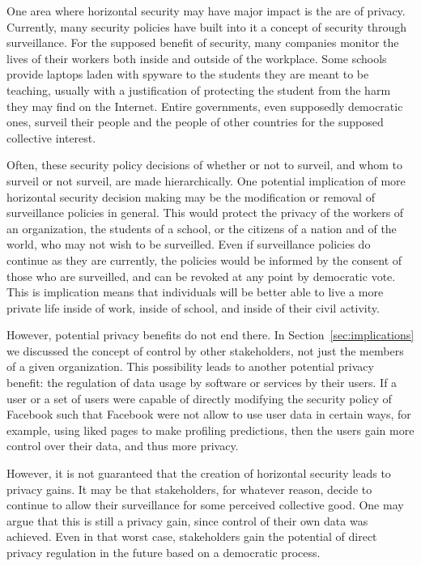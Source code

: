 One area where horizontal security may have major impact is the are of privacy.
Currently, many security policies have built into it a concept of security
through surveillance. For the supposed benefit of security, many companies
monitor the lives of their workers both inside and outside of the workplace.
Some schools provide laptops laden with spyware to the students they are meant
to be teaching, usually with a justification of protecting the student from the
harm they may find on the Internet. Entire governments, even supposedly
democratic ones, surveil their people and the people of other countries for the
supposed collective interest.

Often, these security policy decisions of whether or not to surveil, and whom
to surveil or not surveil, are made hierarchically. One potential implication
of more horizontal security decision making may be the modification or removal
of surveillance policies in general. This would protect the privacy of the
workers of an organization, the students of a school, or the citizens of a
nation and of the world, who may not wish to be surveilled. Even if surveillance
policies do continue as they are currently, the policies would be informed by
the consent of those who are surveilled, and can be revoked at any point by
democratic vote. This is implication means that individuals will be better able
to live a more private life inside of work, inside of school, and inside of
their civil activity.

However, potential privacy benefits do not end there. In 
Section~\ref{sec:implications} we discussed the concept of control by other
stakeholders, not just the members of a given organization. This possibility
leads to another potential privacy benefit: the regulation of data usage by 
software or services by their users. If a user or a set of users were capable of
directly modifying the security policy of Facebook such that Facebook were not
allow to use user data in certain ways, for example, using liked pages to make
profiling predictions, then the users gain more control over their data, and
thus more privacy.

However, it is not guaranteed that the creation of horizontal security leads to
privacy gains. It may be that stakeholders, for whatever reason, decide to
continue to allow their surveillance for some perceived collective good. One may
argue that this is still a privacy gain, since control of their own data was
achieved. Even in that worst case, stakeholders gain the potential of direct
privacy regulation in the future based on a democratic process.
